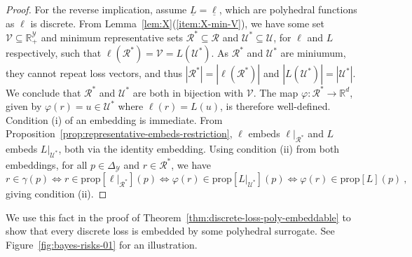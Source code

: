 \documentclass[twoside,11pt]{article}
\newcommand{\Comments}{1}
\newcommand{\mynote}[2]{\ifnum\Comments=1\textcolor{#1}{#2}\fi}
\newcommand{\mytodo}[2]{\ifnum\Comments=1%
  \todo[linecolor=#1!80!black,backgroundcolor=#1,bordercolor=#1!80!black]{#2}\fi}
\newcommand{\raft}[1]{\mytodo{green!20!white}{RF: #1}}
\newcommand{\jessie}[1]{\mynote{teal}{[JF: #1]}}
\newcommand{\jessiet}[1]{\mytodo{teal!20!white}{JF: #1}}
\newcommand{\btw}[1]{\mytodo{gray!20!white}{BTW: #1}}%
\newcommand{\reals}{\mathbb{R}}
\newcommand{\prop}[1]{\mathrm{prop}[#1]}
\newcommand{\simplex}{\Delta_\Y}
\newcommand{\R}{\mathcal{R}}
\newcommand{\Sc}{\mathcal{S}}
\newcommand{\U}{\mathcal{U}}
\newcommand{\V}{\mathcal{V}}
\newcommand{\Y}{\mathcal{Y}}
\newcommand{\risk}[1]{\underline{#1}}
\DeclareMathOperator*{\sgn}{sgn}
\begin{document}
\begin{proof}
	For the reverse implication, assume $\risk{L} = \risk{\ell}$, which are polyhedral functions as $\ell$ is discrete.
  From Lemma~\ref{lem:X}(\ref{item:X-min-V}), we have some set $\V\subseteq\reals^\Y_+$ and minimum representative sets $\R^* \subseteq \R$ and $\U^* \subseteq \U$, for $\ell$ and $L$ respectively, such that $\ell(\R^*) = \V = L(\U^*)$.
  As $\R^*$ and $\U^*$ are miniumum, they cannot repeat loss vectors, and thus $|\R^*|=|\ell(\R^*)|$ and $|L(\U^*)|=|\U^*|$.
  We conclude that $\R^*$ and $\U^*$ are both in bijection with $\V$.
  The map $\varphi :\R^* \to \reals^d$, given by $\varphi(r) = u \in \U^*$ where $\ell(r) = L(u)$, is therefore well-defined.
  Condition (i) of an embedding is immediate.
  From Proposition~\ref{prop:representative-embeds-restriction}, $\ell$ embeds $\ell|_{\R^*}$ and $L$ embeds $L|_{\U^*}$, both via the identity embedding.
  Using condition (ii) from both embeddings, for all $p\in\simplex$ and $r\in\R^*$, we have
  \begin{equation*}
    r \in \gamma(p) \iff r \in \prop{\ell|_{\R^*}}(p) \iff \varphi(r) \in \prop{L|_{\U^*}}(p)
    \iff \varphi(r) \in \prop{L}(p)~,
  \end{equation*}
  giving condition (ii).
\end{proof}


We use this fact in the proof of Theorem~\ref{thm:discrete-loss-poly-embeddable} to show that every discrete loss is embedded by some polyhedral surrogate.
See Figure~\ref{fig:bayes-risks-01} for an illustration.


\end{document}
